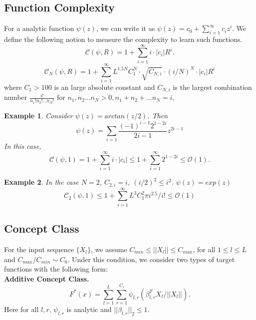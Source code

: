\documentclass{article}
\newcommand{\cO}{\mathcal{O}}
\newtheorem{exa}{\textbf{Example}}[section]
\begin{document}
\subsection{Function Complexity}\label{fc}
For a analytic  function $\psi(z)$, we can write it as $\psi(z)=  c_0+ \sum_{i=1}^\infty c_{i}z^{i}$. We define the following notion to measure the complexity to learn such functions.
\begin{equation}
\mathscr{C}(\psi,R)= 1+\sum_{i=1}^\infty i\cdot |c_{i}|R^{i}.
\end{equation}
\begin{equation}
\mathscr{C}_N(\psi, R)= 1+\sum_{i=1}^\infty  L^{1.5N} C_1^N\cdot \sqrt{C_{N,i}}\cdot (i/N)^N  \cdot |c_{i}|R^{i}
\end{equation}
where $C_1>100$ is an large absolute constant and $C_{N,i}$ is the  largest combination number $\frac{i!}{n_1!n_2!...n_N!}$ for $n_1,n_2...n_N>0, n_1+n_2+...n_N=i$,
\begin{exa} \cite{sa}
Consider $\psi(z)= arctan(z/2)$. Then
\begin{equation}
\psi(z)=\sum_{i=1}\frac{(-1)^{i-1}2^{1-2i}}{2i-1}z^{2i-1}
\end{equation}
In this case, $$\mathscr{C}(\psi,1)=1+\sum_{i=1}^\infty i\cdot |c_{i}|\leq 1+\sum_{i=1}^\infty 2^{1-2i}\leq \cO(1).$$
\end{exa}
\begin{exa}
In the case $N=2$, $C_{2,i}=i$, $(i/2)^2\leq i^2$. $\psi(z)= exp(z)$
$$\mathscr{C}_2(\psi,1)\leq1+\sum_{i=1}^\infty L^3C_1^2 \pi i^{2.5}/i!\leq \cO(1)$$
\end{exa}

\subsection{Concept Class}\label{fcc}
For the input sequence $\{X_l\}$, we assume $C_{min}\leq ||X_l||\leq C_{max}$, for all $1\leq l\leq L$ and $C_{max}/C_{min}\sim C_0$. Under this condition, we consider two types of target functions with the following form:\\
{\bf Additive Concept Class.}
\begin{equation}\label{cop}
F^*(x)=\sum_{l=1}^{L} \sum_{r=1}^{C_l} \psi_{l,r}(\beta^T_{l,r}X_l/||X_l||).
\end{equation}
Here for all $l,r$, $\psi_{l,r}$ is analytic  and $||\beta_{l,r}||_2\leq 1$.
\end{document}

